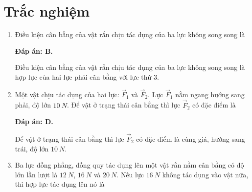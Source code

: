 \whiteBGstarBegin
\setcounter{section}{0}
\section{Trắc nghiệm}
\begin{enumerate}[label=\bfseries Câu \arabic*:]
	
	\item {}
	
	\cauhoi
	{Điều kiện cân bằng của vật rắn chịu tác dụng của ba lực không song song là
	}
	
	\loigiai
	{	\textbf{Đáp án: B.}
		
		Điều kiện cân bằng của vật rắn chịu tác dụng của ba lực không song song là hợp lực của hai lực phải cân bằng với lực thứ 3.
	}
	
	\item {}
	
	\cauhoi
	{Một vật chịu tác dụng của hai lực: $\vec F_1$ và $\vec F_2$. Lực $\vec F_1$ nằm ngang hướng sang phải, độ lớn $\SI{10}{N}$. Để vật ở trạng thái cân bằng thì lực $\vec F_2$ có đặc điểm là
	}
	
	\loigiai
	{	\textbf{Đáp án: D.}
		
	Để vật ở trạng thái cân bằng thì lực $\vec F_2$ có đặc điểm là cùng giá, hướng sang trái, độ lớn $\SI{10}{N}$.
	}
	\item {}
	
	\cauhoi
	{Ba lực đồng phẳng, đồng quy tác dụng lên một vật rắn nằm cân bằng có độ lớn lần lượt là $\SI{12}{N}$, $\SI{16}{N}$ và $\SI{20}{N}$. Nếu lực $\SI{16}{N}$ không tác dụng vào vật nữa, thì hợp lực tác dụng lên nó là
	}
	

\end{enumerate}
